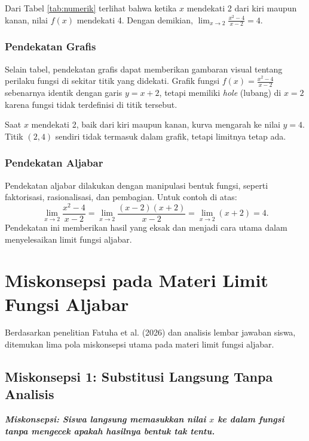 \documentclass[12pt,a4paper,openany]{book}
\theoremstyle{definition}
\newcommand{\miskonsepsi}[1]{\textbf{\textit{Miskonsepsi: #1}}}
\begin{document}
Dari Tabel \ref{tab:numerik} terlihat bahwa ketika $x$ mendekati 2 dari kiri maupun kanan, nilai $f(x)$ mendekati 4. Dengan demikian, $\lim_{x \to 2} \frac{x^2-4}{x-2} = 4$.

\subsection{Pendekatan Grafis}

Selain tabel, pendekatan grafis dapat memberikan gambaran visual tentang perilaku fungsi di sekitar titik yang didekati. Grafik fungsi $f(x) = \frac{x^2-4}{x-2}$ sebenarnya identik dengan garis $y = x + 2$, tetapi memiliki \textit{hole} (lubang) di $x = 2$ karena fungsi tidak terdefinisi di titik tersebut.

Saat $x$ mendekati 2, baik dari kiri maupun kanan, kurva mengarah ke nilai $y = 4$. Titik $(2, 4)$ sendiri tidak termasuk dalam grafik, tetapi limitnya tetap ada.

\subsection{Pendekatan Aljabar}

Pendekatan aljabar dilakukan dengan manipulasi bentuk fungsi, seperti faktorisasi, rasionalisasi, dan pembagian. Untuk contoh di atas:
\[
\lim_{x \to 2} \frac{x^2 - 4}{x - 2} = \lim_{x \to 2} \frac{(x - 2)(x + 2)}{x - 2} = \lim_{x \to 2} (x + 2) = 4.
\]
Pendekatan ini memberikan hasil yang eksak dan menjadi cara utama dalam menyelesaikan limit fungsi aljabar.

\chapter{Miskonsepsi pada Materi Limit Fungsi Aljabar}

Berdasarkan penelitian Fatuha et al. (2026) dan analisis lembar jawaban siswa, ditemukan lima pola miskonsepsi utama pada materi limit fungsi aljabar.

\section{Miskonsepsi 1: Substitusi Langsung Tanpa Analisis}

\miskonsepsi{Siswa langsung memasukkan nilai $x$ ke dalam fungsi tanpa mengecek apakah hasilnya bentuk tak tentu.}
\end{document}
